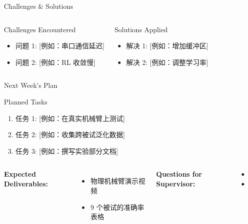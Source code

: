 \documentclass[aspectratio=169, 11pt]{beamer}
\begin{document}
\begin{frame}{Challenges \& Solutions}
    \begin{columns}[T]
        \begin{alertblock}{Challenges Encountered}
            \begin{itemize}
                \item 问题 1: [例如：串口通信延迟]
                \item 问题 2: [例如：RL 收敛慢]
            \end{itemize}
        \end{alertblock}
        
        \begin{exampleblock}{Solutions Applied}
            \begin{itemize}
                \item 解决 1: [例如：增加缓冲区]
                \item 解决 2: [例如：调整学习率]
            \end{itemize}
        \end{exampleblock}
    \end{columns}
\end{frame}

\begin{frame}{Next Week's Plan}
    \begin{block}{Planned Tasks}
        \begin{enumerate}
            \item 任务 1: [例如：在真实机械臂上测试]
            \item 任务 2: [例如：收集跨被试泛化数据]
            \item 任务 3: [例如：撰写实验部分文档]
        \end{enumerate}
    \end{block}
    
    \vspace{5mm}
    
    \begin{columns}[T]
        \textbf{Expected Deliverables:}
        \begin{itemize}
            \item 物理机械臂演示视频
            \item 9 个被试的准确率表格
        \end{itemize}
        
        \textbf{Questions for Supervisor:}
        \begin{itemize}
            \item [需要讨论的问题]
            \item [需要的资源/帮助]
        \end{itemize}
    \end{columns}
\end{frame}
\end{document}
